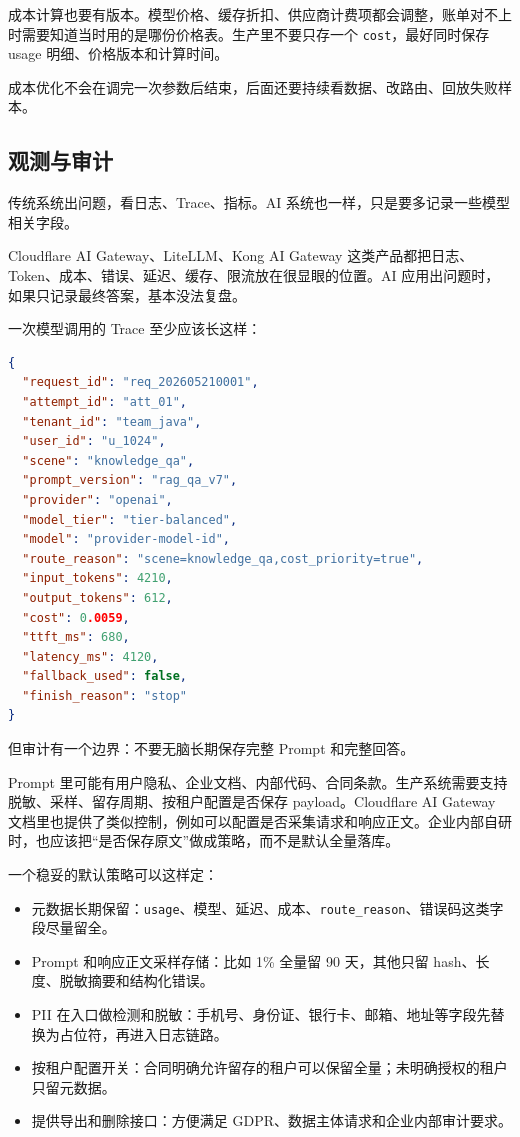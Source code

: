 \documentclass[10pt,a4paper]{ctexart}
\begin{document}
成本计算也要有版本。模型价格、缓存折扣、供应商计费项都会调整，账单对不上时需要知道当时用的是哪份价格表。生产里不要只存一个 \texttt{cost}，最好同时保存 usage 明细、价格版本和计算时间。



成本优化不会在调完一次参数后结束，后面还要持续看数据、改路由、回放失败样本。



\subsection{观测与审计}


传统系统出问题，看日志、Trace、指标。AI 系统也一样，只是要多记录一些模型相关字段。



Cloudflare AI Gateway、LiteLLM、Kong AI Gateway 这类产品都把日志、Token、成本、错误、延迟、缓存、限流放在很显眼的位置。AI 应用出问题时，如果只记录最终答案，基本没法复盘。



一次模型调用的 Trace 至少应该长这样：



\begin{lstlisting}[language=json]
{
  "request_id": "req_202605210001",
  "attempt_id": "att_01",
  "tenant_id": "team_java",
  "user_id": "u_1024",
  "scene": "knowledge_qa",
  "prompt_version": "rag_qa_v7",
  "provider": "openai",
  "model_tier": "tier-balanced",
  "model": "provider-model-id",
  "route_reason": "scene=knowledge_qa,cost_priority=true",
  "input_tokens": 4210,
  "output_tokens": 612,
  "cost": 0.0059,
  "ttft_ms": 680,
  "latency_ms": 4120,
  "fallback_used": false,
  "finish_reason": "stop"
}
\end{lstlisting}



但审计有一个边界：不要无脑长期保存完整 Prompt 和完整回答。



Prompt 里可能有用户隐私、企业文档、内部代码、合同条款。生产系统需要支持脱敏、采样、留存周期、按租户配置是否保存 payload。Cloudflare AI Gateway 文档里也提供了类似控制，例如可以配置是否采集请求和响应正文。企业内部自研时，也应该把“是否保存原文”做成策略，而不是默认全量落库。



一个稳妥的默认策略可以这样定：


\begin{itemize}[itemsep=2pt, topsep=4pt]
  \item 元数据长期保留：\texttt{usage}、模型、延迟、成本、\texttt{route\_reason}、错误码这类字段尽量留全。
  \item Prompt 和响应正文采样存储：比如 1\% 全量留 90 天，其他只留 hash、长度、脱敏摘要和结构化错误。
  \item PII 在入口做检测和脱敏：手机号、身份证、银行卡、邮箱、地址等字段先替换为占位符，再进入日志链路。
  \item 按租户配置开关：合同明确允许留存的租户可以保留全量；未明确授权的租户只留元数据。
  \item 提供导出和删除接口：方便满足 GDPR、数据主体请求和企业内部审计要求。
\end{itemize}
\end{document}
